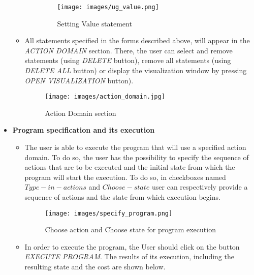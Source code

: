 \documentclass[a4paper]{article}
\begin{document}
\begin{itemize}
\begin{itemize}
\begin{itemize}
                    \begin{figure}[H]
                        \centering
                        \texttt{[image: images/ug\_value.png]}
                        \caption{Setting Value statement}
                        \label{fig:cm-rho-001}
                    \end{figure}
            \end{itemize}
        \item[] All statements specified in the forms described above, will appear in the \textit{ACTION DOMAIN} section. There, the user can select and remove statements (using \textit{DELETE} button), remove all statements (using \textit{DELETE ALL} button) or display the visualization window by pressing \textit{OPEN VISUALIZATION} button).
        \begin{figure}[H]
                        \centering
                        \texttt{[image: images/action\_domain.jpg]}
                        \caption{Action Domain section}
                        \label{fig:actdomain}
                    \end{figure}
        \end{itemize}
    \item \textbf{Program specification and its execution}
        \begin{itemize}
            \item[] The user is able to execute the program that will use a specified action domain. To do so, the user has the possibility to specify the sequence of actions that are to be executed and the initial state from which the program will start the execution. To do so, in checkboxes named $Type-in-actions$ and $Choose-state$ user can respectively provide a sequence of actions and the state from which execution begins.
                \begin{figure}[H]
                    \centering
                    \texttt{[image: images/specify\_program.png]}
                    \caption{Choose action and Choose state for program execution}
                    \label{fig:cm-rho-001}
                \end{figure}
            \item[] In order to execute the program, the User should click on the button \textit{EXECUTE PROGRAM}. The results of its execution, including the resulting state and the cost are shown below.
               \begin{figure}[H]
                    \centering

\end{figure}
\end{itemize}
\end{itemize}
\end{document}
